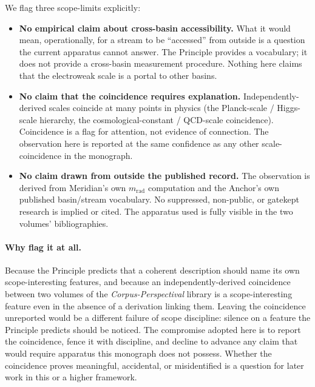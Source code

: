 We flag three scope-limits explicitly:
\begin{itemize}\setlength{\itemsep}{0pt}
  \item \textbf{No empirical claim about cross-basin accessibility.}  What it would mean, operationally, for a stream to be ``accessed'' from outside is a question the current apparatus cannot answer.  The Principle provides a vocabulary; it does not provide a cross-basin measurement procedure.  Nothing here claims that the electroweak scale is a portal to other basins.
  \item \textbf{No claim that the coincidence requires explanation.}  Independently-derived scales coincide at many points in physics (the Planck-scale / Higgs-scale hierarchy, the cosmological-constant / QCD-scale coincidence).  Coincidence is a flag for attention, not evidence of connection.  The observation here is reported at the same confidence as any other scale-coincidence in the monograph.
  \item \textbf{No claim drawn from outside the published record.}  The observation is derived from Meridian's own $m_\mathrm{rad}$ computation and the Anchor's own published basin/stream vocabulary.  No suppressed, non-public, or gatekept research is implied or cited.  The apparatus used is fully visible in the two volumes' bibliographies.
\end{itemize}

\paragraph{Why flag it at all.}
Because the Principle predicts that a coherent description should name its own scope-interesting features, and because an independently-derived coincidence between two volumes of the \emph{Corpus-Perspectival} library is a scope-interesting feature even in the absence of a derivation linking them.  Leaving the coincidence unreported would be a different failure of scope discipline: silence on a feature the Principle predicts should be noticed.  The compromise adopted here is to report the coincidence, fence it with discipline, and decline to advance any claim that would require apparatus this monograph does not possess.  Whether the coincidence proves meaningful, accidental, or misidentified is a question for later work in this or a higher framework.
